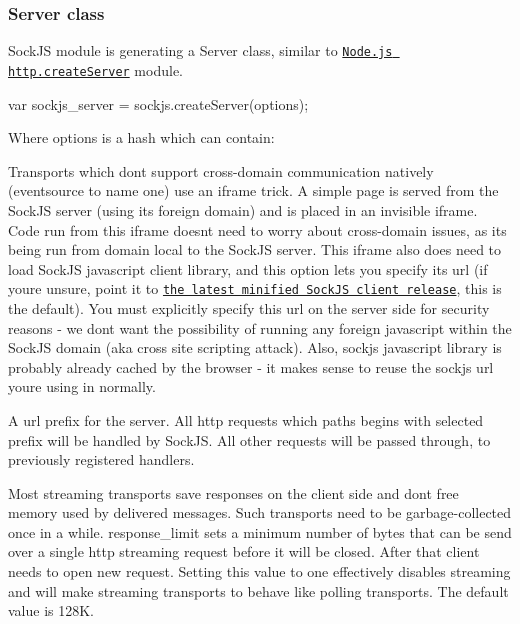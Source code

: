 \subsubsection*{Server class}

Sock\+JS module is generating a {\ttfamily Server} class, similar to \href{http://nodejs.org/docs/v0.5.8/api/http.html#http.createServer}{\tt Node.\+js http.\+create\+Server} module.


\begin{DoxyCode}
var sockjs\_server = sockjs.createServer(options);
\end{DoxyCode}


Where {\ttfamily options} is a hash which can contain\+:


\begin{DoxyDescription}
\item[sockjs\+\_\+url (string, required) ]Transports which don\textquotesingle{}t support cross-\/domain communication natively (\textquotesingle{}eventsource\textquotesingle{} to name one) use an iframe trick. A simple page is served from the Sock\+JS server (using its foreign domain) and is placed in an invisible iframe. Code run from this iframe doesn\textquotesingle{}t need to worry about cross-\/domain issues, as it\textquotesingle{}s being run from domain local to the Sock\+JS server. This iframe also does need to load Sock\+JS javascript client library, and this option lets you specify its url (if you\textquotesingle{}re unsure, point it to \href{http://cdn.jsdelivr.net/sockjs/1.0.1/sockjs.min.js}{\tt the latest minified Sock\+JS client release}, this is the default). You must explicitly specify this url on the server side for security reasons -\/ we don\textquotesingle{}t want the possibility of running any foreign javascript within the Sock\+JS domain (aka cross site scripting attack). Also, sockjs javascript library is probably already cached by the browser -\/ it makes sense to reuse the sockjs url you\textquotesingle{}re using in normally.


\item[prefix (string regex) ]A url prefix for the server. All http requests which paths begins with selected prefix will be handled by Sock\+JS. All other requests will be passed through, to previously registered handlers.


\item[response\+\_\+limit (integer) ]Most streaming transports save responses on the client side and don\textquotesingle{}t free memory used by delivered messages. Such transports need to be garbage-\/collected once in a while. {\ttfamily response\+\_\+limit} sets a minimum number of bytes that can be send over a single http streaming request before it will be closed. After that client needs to open new request. Setting this value to one effectively disables streaming and will make streaming transports to behave like polling transports. The default value is 128K.



\end{DoxyDescription}
